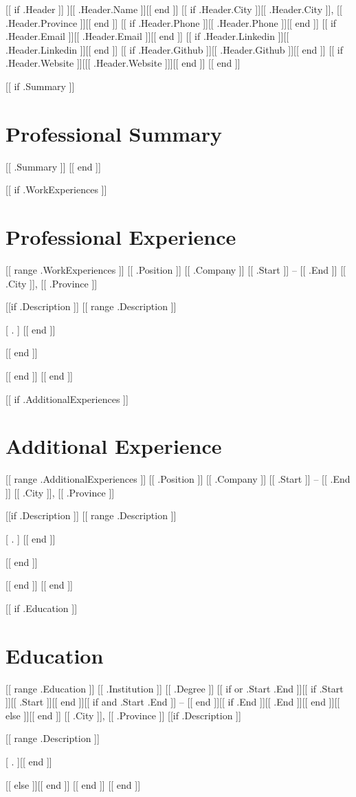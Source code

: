 \documentclass[letterpaper]{resume_config}
\begin{document}
[[ if .Header ]]
\Header
    [[ if .Header.Name ]]{[[ .Header.Name ]]}[[ end ]]
    [[ if .Header.City ]]{[[ .Header.City ]],  [[ .Header.Province ]]}[[ end ]]
    [[ if .Header.Phone ]]{[[ .Header.Phone ]]}[[ end ]]
    [[ if .Header.Email ]]{[[ .Header.Email ]]}[[ end ]]
    [[ if .Header.Linkedin ]]{[[ .Header.Linkedin ]]}[[ end ]]
    [[ if .Header.Github ]]{[[ .Header.Github ]]}[[ end ]]
    [[ if .Header.Website ]][{[[ .Header.Website ]]}][[ end ]]
[[ end ]]

[[ if .Summary ]]
\section{Professional Summary}
    {[[ .Summary ]]}
[[ end ]]


[[ if .WorkExperiences ]]
\section{Professional Experience}
[[ range .WorkExperiences ]]
\WorkExperience
    {[[ .Position ]]}
    {[[ .Company ]]}
    {[[ .Start ]] -- [[ .End ]]}
    {[[ .City ]], [[ .Province ]]}
    {
        [[if .Description ]]
        [[ range .Description ]]
            \item [[ . ]]
        [[ end ]]
        }
[[ end ]]
\vspace{5pt}

[[ end ]]
[[ end ]]

[[ if .AdditionalExperiences ]]
\section{Additional Experience}
[[ range .AdditionalExperiences ]]
\WorkExperience
    {[[ .Position ]]}
    {[[ .Company ]]}
    {[[ .Start ]] -- [[ .End ]]}
    {[[ .City ]], [[ .Province ]]}
    {
        [[if .Description ]]
        [[ range .Description ]]
            \item [[ . ]]
        [[ end ]]
        }
[[ end ]]
\vspace{5pt}

[[ end ]]
[[ end ]]

[[ if .Education ]]
\section{Education}
[[ range .Education ]]
\EducationExperience
    {[[ .Institution ]]}
    {[[ .Degree ]]}
    [[ if or .Start .End ]]{[[ if .Start ]][[ .Start ]][[ end ]][[ if and .Start .End ]] -- [[ end ]][[ if .End ]][[ .End ]][[ end ]]}[[ else ]]{}[[ end ]]
    {[[ .City ]], [[ .Province ]]}
    [[if .Description ]]{[[ range .Description ]]\item [[ . ]][[ end ]]}[[ else ]]{}[[ end ]]
\vspace{5pt}
[[ end ]]
[[ end ]]
\end{document}
